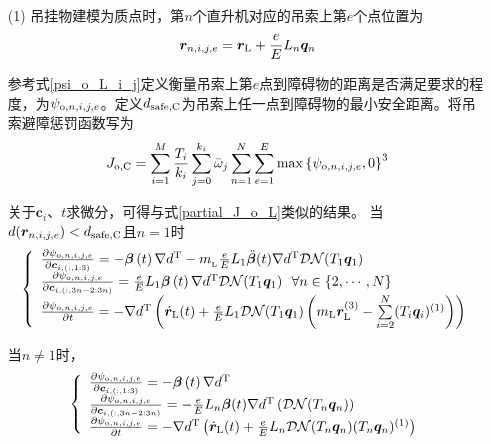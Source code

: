 \begin{enumerate}
\item [(1)] 吊挂物建模为质点时，第$n$个直升机对应的吊索上第$e$个点位置为
\begin{equation}
    \boldsymbol{r}_{n,i,j,e} = \boldsymbol{r}_{\rm{L}} + \frac{e}{E}L_n \boldsymbol{q}_n
\end{equation}

参考式\ref{psi_o_L_i_j}定义衡量吊索上第$e$点到障碍物的距离是否满足要求的程度，为$\psi_{{\rm{o}}, n,i,j,e}$。定义$d_{{\rm{safe,C}}}$为吊索上任一点到障碍物的最小安全距离。将吊索避障惩罚函数写为
\begin{equation}\label{J_i_o_l}
    J_{{\rm{o,C}}} = \sum\limits_{i=1}^{M}\frac{T_i}{k_i}\sum\limits_{j=0}^{k_i}\bar{\omega}_j \sum\limits_{n=1}^N \sum\limits_{e=1}^{E}\max\left\{
        \psi_{{\rm{o}}, n,i,j,e} ,0
    \right\}^3
\end{equation}

关于$\boldsymbol{c}_i$、$t$求微分，可得与式\ref{partial_J_o_L}类似的结果。
当$d(\boldsymbol{r}_{n,i,j,e}) < d_{{\rm{safe,C}}}$且$n=1$时
\begin{equation}
    \left\{\begin{array}{l}
        \frac{\partial \psi_{{\rm{o}}, n,i,j,e}}{\partial \boldsymbol{c}_{i,(:,1:3)}} = -\boldsymbol{\beta}\left(t\right)\nabla d^{\rm{T}} - m_{\rm{_L}}\frac{e}{E}L_1 \ddot{\boldsymbol{\beta}}(t) \nabla d^{\rm{T}} \mathcal{DN}(T_1\boldsymbol{q}_1)\\
        \frac{\partial \psi_{{\rm{o}}, n,i,j,e}}{\partial \boldsymbol{c}_{i,(:,3n-2:3n)}} =  \frac{e}{E}L_1\boldsymbol{\beta}\left(t\right) \nabla d^{\rm{T}}\mathcal{DN}(T_1\boldsymbol{q}_1) \,\,\,\, \forall n \in \left\{ 2, \cdots, N \right\}\\
        \frac{\partial \psi_{{\rm{o}}, n,i,j,e}}{\partial t} = -\nabla d^{\rm{T}} \left(
            \dot{\boldsymbol{r}}_{\rm{L}}(t) + \frac{e}{E}L_1\mathcal{DN}(T_1\boldsymbol{q}_1)\left(
                m_{\rm{L}}\boldsymbol{r}_{\rm{L}}^{(3)}
                -\sum\limits_{i=2}^N (T_i\boldsymbol{q}_i)^{(1)}
            \right) 
        \right)
    \end{array}
    \right.
\end{equation}

当$n \ne 1$时，
\begin{equation}
    \left\{\begin{array}{l}
        \frac{\partial \psi_{{\rm{o}}, n,i,j,e}}{\partial \boldsymbol{c}_{i,(:,1:3)}} =  - \boldsymbol{\beta}\left(t\right) \nabla d^{\rm{T}}\\
        \frac{\partial \psi_{{\rm{o}}, n,i,j,e}}{\partial \boldsymbol{c}_{i,(:,3n-2:3n)}} =   -\frac{e}{E}L_{n}{\boldsymbol{\beta}}(t) \nabla d^{\rm{T}}\left(\mathcal{DN}(T_{n}\boldsymbol{q}_{n})\right)\\
        \frac{\partial \psi_{{\rm{o}}, n,i,j,e}}{\partial t} = -\nabla d^{\rm{T}} \left(
            \dot{\boldsymbol{r}}_{\rm{L}}(t) + \frac{e}{E}L_{n}\mathcal{DN}(T_{n}\boldsymbol{q}_{n})(T_{n}\boldsymbol{q}_{n})^{(1)}
        \right) 
    \end{array}
    \right.
\end{equation}


\end{enumerate}
